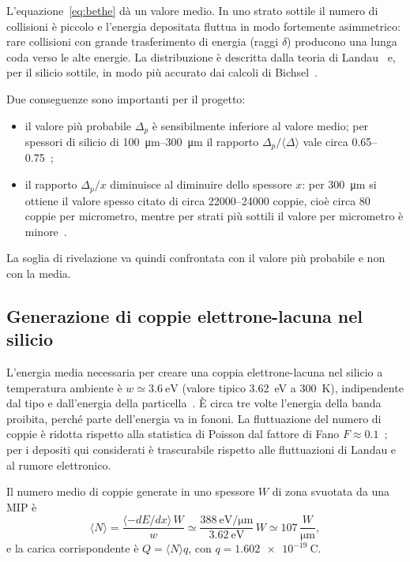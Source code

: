 \documentclass[11pt,a4paper]{article}
\begin{document}
L'equazione~\eqref{eq:bethe} dà un valore medio. In uno strato sottile il numero di collisioni è piccolo e l'energia depositata fluttua in modo fortemente asimmetrico: rare collisioni con grande trasferimento di energia (raggi $\delta$) producono una lunga coda verso le alte energie. La distribuzione è descritta dalla teoria di Landau~\cite{landau1944} e, per il silicio sottile, in modo più accurato dai calcoli di Bichsel~\cite{bichsel1988}.

Due conseguenze sono importanti per il progetto:
\begin{itemize}
  \item il valore più probabile $\Delta_p$ è sensibilmente inferiore al valore medio; per spessori di silicio di \SIrange{100}{300}{\micro\metre} il rapporto $\Delta_p/\langle\Delta\rangle$ vale circa \numrange{0.65}{0.75}~\cite{bichsel1988,pdg2024};
  \item il rapporto $\Delta_p/x$ diminuisce al diminuire dello spessore $x$: per \SI{300}{\micro\metre} si ottiene il valore spesso citato di circa \num{22000}--\num{24000} coppie, cioè circa \num{80} coppie per micrometro, mentre per strati più sottili il valore per micrometro è minore~\cite{bichsel1988}.
\end{itemize}
La soglia di rivelazione va quindi confrontata con il valore più probabile e non con la media.

\subsection{Generazione di coppie elettrone-lacuna nel silicio}

L'energia media necessaria per creare una coppia elettrone-lacuna nel silicio a temperatura ambiente è $w \simeq \SI{3.6}{\electronvolt}$ (valore tipico \SI{3.62}{\electronvolt} a \SI{300}{\kelvin}), indipendente dal tipo e dall'energia della particella~\cite{klein1968,knoll2010}. È circa tre volte l'energia della banda proibita, perché parte dell'energia va in fononi. La fluttuazione del numero di coppie è ridotta rispetto alla statistica di Poisson dal fattore di Fano $F\approx0.1$~\cite{fano1947}; per i depositi qui considerati è trascurabile rispetto alle fluttuazioni di Landau e al rumore elettronico.

Il numero medio di coppie generate in uno spessore $W$ di zona svuotata da una MIP è
\begin{equation}
  \langle N \rangle = \frac{\langle -dE/dx \rangle\, W}{w} \simeq \frac{\SI{388}{\electronvolt\per\micro\metre}}{\SI{3.62}{\electronvolt}}\,W \simeq 107\,\frac{W}{\si{\micro\metre}},
\end{equation}
e la carica corrispondente è $Q = \langle N\rangle q$, con $q=\SI{1.602e-19}{\coulomb}$.
\end{document}

